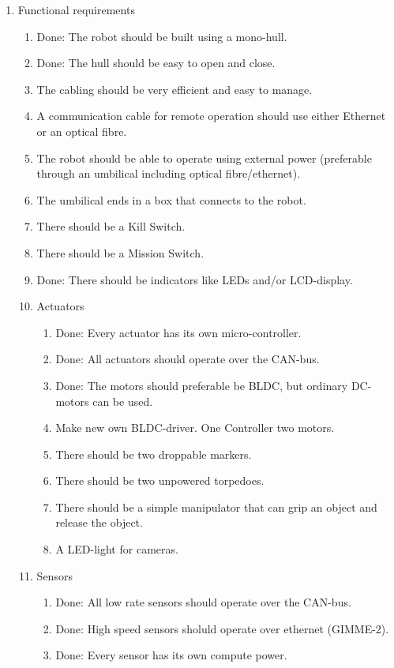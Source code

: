 \begin{enumerate}
\label{requirements}
\item Functional requirements
\begin{enumerate}
\item {\color{green}Done: The robot should be built using a mono-hull.}
\item {\color{green}Done: The hull should be easy to open and close.}
\item The cabling should be very efficient and easy to manage.
\item A communication cable for remote operation should use either Ethernet or an optical fibre. 
\item The robot should be able to operate using external power (preferable through an umbilical including optical fibre/ethernet).
\item The umbilical ends in a box that connects to the robot. 
\item There should be a Kill Switch.
\item There should be a Mission Switch.
\item {\color{green}Done: There should be indicators like LEDs and/or LCD-display.}
\item Actuators
\begin{enumerate}
\item {\color{green}Done: Every actuator has its own micro-controller.}
\item {\color{green}Done: All actuators should operate over the CAN-bus.}
\item {\color{green}Done: The motors should preferable be BLDC, but ordinary DC-motors can be used.}
\item Make new own BLDC-driver. One Controller two motors.
\item There should be two droppable markers.
\item There should be two unpowered torpedoes.
\item There should be a simple manipulator that can grip an object and release the object.
\item A LED-light for cameras.
\end{enumerate}
\item Sensors
\begin{enumerate}
\item {\color{green}Done: All low rate sensors should operate over the CAN-bus.}
\item {\color{green}Done: High speed sensors sholuld operate over ethernet (GIMME-2).}
\item {\color{green}Done: Every sensor has its own compute power.}

\end{enumerate}
\end{enumerate}
\end{enumerate}
